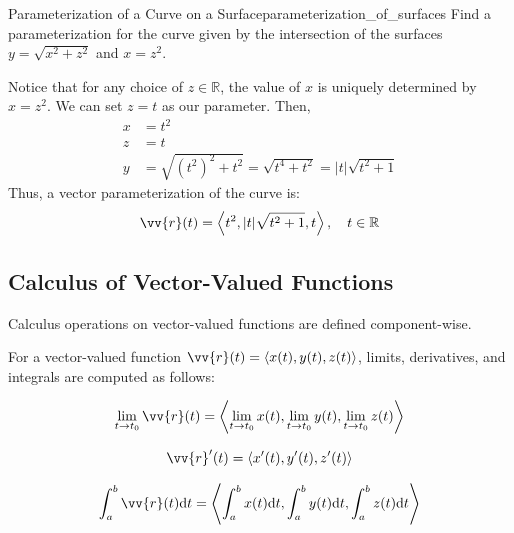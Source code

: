 \begin{problem}{Parameterization of a Curve on a Surface}{parameterization_of_surfaces}
Find a parameterization for the curve given by the intersection of the surfaces $y = \sqrt{x^2 + z^2}$ and $x = z^2$.
\end{problem}

\begin{sol}
Notice that for any choice of $z \in \mathbb{R}$, the value of $x$ is uniquely determined by $x = z^2$. We can set $z = t$ as our parameter.
Then,
\begin{align*}
    x &= t^2 \\
    z &= t \\
    y &= \sqrt{(t^2)^2 + t^2} = \sqrt{t^4 + t^2} = |t|\sqrt{t^2 + 1}
\end{align*}
Thus, a vector parameterization of the curve is:
\[
\vv{r}(t) = \ang{t^2, |t|\sqrt{t^2 + 1}, t}, \quad t \in \mathbb{R}
\]
\end{sol}

\subsection{Calculus of Vector-Valued Functions}

Calculus operations on vector-valued functions are defined component-wise.

For a vector-valued function $\vv{r}(t) = \ang{x(t), y(t), z(t)}$, limits, derivatives, and integrals are computed as follows:

\[
\lim_{t \to t_0} \vv{r}(t) = \ang{\lim_{t \to t_0} x(t), \lim_{t \to t_0} y(t), \lim_{t \to t_0} z(t)}
\]

\[
\vv{r}'(t) = \ang{x'(t), y'(t), z'(t)}
\]

\[
\int_a^b \vv{r}(t) \dd{t} = \ang{\int_a^b x(t) \dd{t}, \int_a^b y(t) \dd{t}, \int_a^b z(t) \dd{t}}
\]

